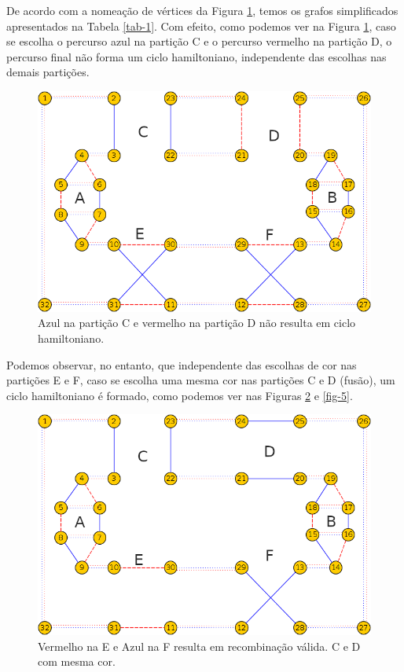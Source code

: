 \documentclass[
	article,			%
	11pt,				%
	oneside,			%
	a4paper,			%
	english,			%
	brazil,				%
	sumario=tradicional
	]{abntex2}
\begin{document}
De acordo com a nomeação de vértices da Figura \ref{fig-3}, temos os grafos simplificados apresentados na Tabela \ref{tab-1}. Com efeito, como podemos ver na Figura \ref{fig-3}, caso se escolha o percurso azul na partição C e o percurso vermelho na partição D, o percurso final não forma um ciclo hamiltoniano, independente das escolhas nas demais partições.

\begin{figure}[tbph!]
	\centering
	\includegraphics[width=0.7\linewidth]{fig-3}
	\caption{Azul na partição C e vermelho na partição D não resulta em ciclo hamiltoniano.}
	\label{fig-3}
\end{figure}

Podemos observar, no entanto, que independente das escolhas de cor nas partições E e F, caso se escolha uma mesma cor nas partições C e D (fusão), um ciclo hamiltoniano é formado, como podemos ver nas Figuras \ref{fig-4} e \ref{fig-5}.

\begin{figure}[tbph!]
	\centering
	\includegraphics[width=0.7\linewidth]{fig-4}
	\caption{Vermelho na E e Azul na F resulta em recombinação válida. C e D com mesma cor.}
	\label{fig-4}
\end{figure}
\end{document}
